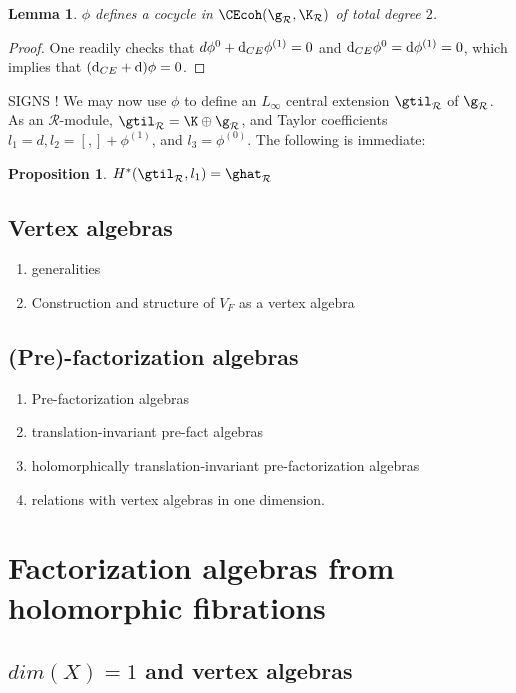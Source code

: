 \documentclass[12pt]{amsart}
\newtheorem{prop}[thm]{Proposition}
\newtheorem{lemma}[thm]{Lemma}
\theoremstyle{definition}
\theoremstyle{remark}
\newcommand{\R}{\mathcal{R}}
\def\d{{\rm d}}
\begin{document}
\begin{lemma}
$\phi$ defines a cocycle in $\CEcoh(\g_{\R}, \K_{\R}) $ of total degree $2$.
\end{lemma}
\begin{proof}
One readily checks that $d \phi^{0} + \d_{CE} \phi^{(1)} = 0 $ and $\d_{CE} \phi^{0} = \d \phi^{(1)} = 0$, which implies that $(\d_{CE} + \d) \phi = 0$.
\end{proof}

{\color{red} SIGNS !}
We may now use $\phi$ to define an $L_{\infty}$ central extension $\gtil_{\R}$ of $\g_{\R}$. As an $\R$-module, $ \gtil_{\R} = \K \oplus \g_{\R} $, and Taylor coefficients $l_1 = d, l_2 = [,] + \phi^{(1)}$, and $l_3 = \phi^{(0)}$. The following is immediate:

\begin{prop}
$H^{*}(\gtil_{\R}, l_1) = \ghat_{\R}$
\end{prop} 

\subsection{Vertex algebras}
\begin{enumerate}
\item generalities
\item Construction and structure of $V_{F}$ as a vertex algebra
\end{enumerate}


\subsection{(Pre)-factorization algebras}
\begin{enumerate}
\item Pre-factorization algebras
\item translation-invariant pre-fact algebras
\item holomorphically  translation-invariant pre-factorization algebras
\item relations with vertex algebras in one dimension. 
\end{enumerate}

\section{Factorization algebras from holomorphic fibrations}
\subsection{$dim(X)=1$ and vertex algebras}
\end{document}
